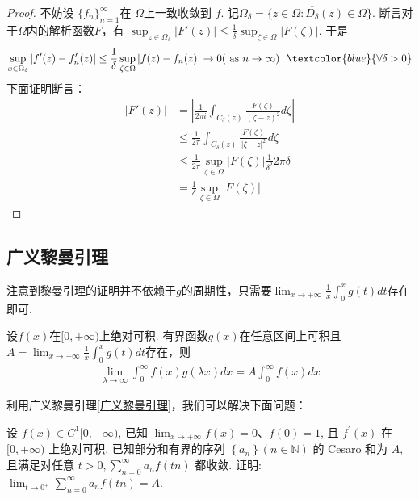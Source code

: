 \begin{proof}
    不妨设 $\displaystyle \{f_n\}_{n=1}^\infty$在 $\displaystyle \Omega$上一致收敛到 $\displaystyle f$. 记$\Omega_\delta=\{z\in \Omega:\overline{D_\delta}(z)\in \Omega\}$. 断言对于$\Omega$内的解析函数$F$，有 $\displaystyle \sup_{z\in \Omega_\delta}\left|F'(z)\right|\leq \frac{1}{\delta}\sup_{\zeta\in \Omega}\left|F(\zeta)\right|$. 于是
    $$
        \sup_{x\in \Omega_\delta}\left|f'(z)-f'_n(z)\right|\leq \frac{1}{\delta}\sup_{\zeta\in \Omega}\left|f(z)-f_n(z)\right|\rightarrow 0(\text{ as }n\to \infty)\ \ \textcolor{blue}{\forall \delta>0}
    $$
    下面证明断言：
    \begin{align*}
        \left|F'(z)\right| & =\left|\frac{1}{2\pi i}\int_{C_\delta(z)} \frac{F(\zeta)}{(\zeta-z)^2 }d\zeta \right|             \\
                           & \leq \frac{1}{2\pi}\int_{C_\delta(z)} \frac{\left|F(\zeta)\right|}{\left|\zeta-z\right|^2 }d\zeta \\
                           & \leq \frac{1}{2\pi} \sup_{\zeta\in \Omega}\left|F(\zeta)\right| \frac{1}{\delta^2}2\pi \delta     \\
                           & =\frac{1}{\delta}\sup_{\zeta\in \Omega}\left|F(\zeta)\right|
    \end{align*}
\end{proof}

\subsection{广义黎曼引理}

\begin{note}
    注意到黎曼引理的证明并不依赖于$g$的周期性，只需要$\displaystyle \lim_{x\to +\infty}\frac{1}{x}\int_{0}^{x}g(t)dt$存在即可.
\end{note}

\begin{theorem}[广义黎曼引理]\label{广义黎曼引理}
    设$f(x)$在$[0,+\infty)$上绝对可积. 有界函数$g(x)$在任意区间上可积且$\displaystyle A=\lim_{x\to +\infty}\frac{1}{x}\int_{0}^{x}g(t)dt$存在，则
    \begin{align*}
        \lim_{\lambda\to \infty}\int_{0}^{\infty}f(x)g(\lambda x)dx=A\int_{0}^{\infty}f(x)dx
    \end{align*}
\end{theorem}

利用广义黎曼引理\cref{广义黎曼引理}，我们可以解决下面问题：

\begin{exercise}
设 $f(x) \in C^1[0,+\infty)$, 已知 $\displaystyle \lim _{x \rightarrow+\infty} f(x)=0 、 f(0)=1$, 且 $f^{\prime}(x)$ 在 $[0,+\infty)$ 上绝对可积. 已知部分和有界的序列 $\left\{a_n\right\}(n \in \mathbb{N})$ 的 Cesaro 和为 $A$, 且满足对任意 $\displaystyle t>0, \sum_{n=0}^{\infty} a_n f(t n)$ 都收敛. 证明: $\displaystyle \lim _{t \rightarrow 0^{+}} \sum_{n=0}^{\infty} a_n f(t n)=A$.
\end{exercise}

